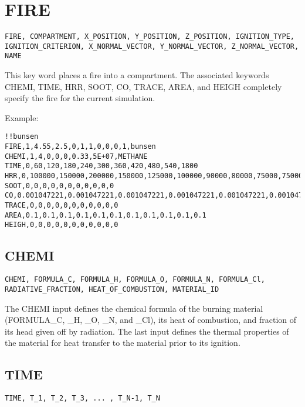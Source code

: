 \section{FIRE}

\begin{lstlisting}
FIRE, COMPARTMENT, X_POSITION, Y_POSITION, Z_POSITION, IGNITION_TYPE, IGNITION_CRITERION, X_NORMAL_VECTOR, Y_NORMAL_VECTOR, Z_NORMAL_VECTOR, NAME
\end{lstlisting}

This key word places a fire  into a compartment. The associated keywords CHEMI, TIME, HRR, SOOT, CO, TRACE, AREA, and HEIGH completely specify the fire for the current simulation.

Example:

\begin{lstlisting}
!!bunsen
FIRE,1,4.55,2.5,0,1,1,0,0,0,1,bunsen
CHEMI,1,4,0,0,0,0.33,5E+07,METHANE
TIME,0,60,120,180,240,300,360,420,480,540,1800
HRR,0,100000,150000,200000,150000,125000,100000,90000,80000,75000,75000
SOOT,0,0,0,0,0,0,0,0,0,0,0
CO,0.001047221,0.001047221,0.001047221,0.001047221,0.001047221,0.001047221,0.001047221,0.001047221,0.001047221,0.001047221,0.001047221
TRACE,0,0,0,0,0,0,0,0,0,0,0
AREA,0.1,0.1,0.1,0.1,0.1,0.1,0.1,0.1,0.1,0.1,0.1
HEIGH,0,0,0,0,0,0,0,0,0,0,0
\end{lstlisting}

\subsection{CHEMI}

\begin{lstlisting}
CHEMI, FORMULA_C, FORMULA_H, FORMULA_O, FORMULA_N, FORMULA_Cl,  RADIATIVE_FRACTION, HEAT_OF_COMBUSTION, MATERIAL_ID
\end{lstlisting}

The CHEMI input defines the chemical formula of the burning material (FORMULA\_C, \_H, \_O, \_N, and \_Cl), its heat of combustion, and fraction of its head given off by radiation. The last input defines the thermal properties of the material for heat transfer to the material prior to its ignition.

\subsection{TIME}

\begin{lstlisting}
TIME, T_1, T_2, T_3, ... , T_N-1, T_N
\end{lstlisting}

